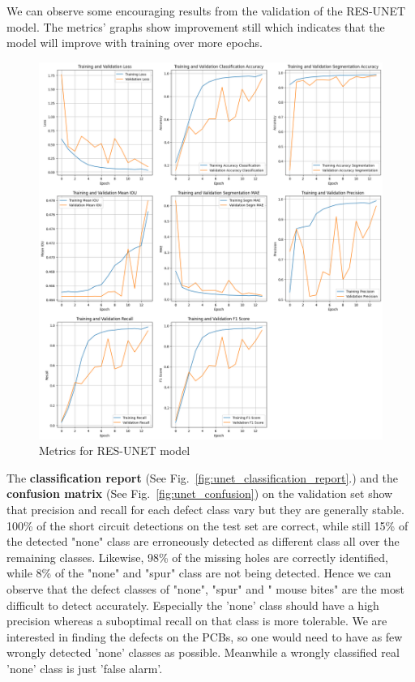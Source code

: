 \documentclass[12pt]{article}
\begin{document}
We can observe some encouraging results from the validation of the RES-UNET model. The metrics' graphs show improvement still which indicates that the model will improve with training over more epochs. 

\begin{figure}[H]
    \centering
    \includegraphics[width=\textwidth, keepaspectratio]{./graphics/RESUNET_training-history_v240618_1.png}
    \caption{Metrics for RES-UNET model}
    \label{fig:unet_training_history}
\end{figure}
\restoregeometry
\clearpage

The {\bf classification report} (See Fig.~\ref{fig:unet_classification_report}.) and the {\bf confusion matrix} (See Fig.~\ref{fig:unet_confusion}) on the validation set show that precision and recall for each defect class vary but they are generally stable. 100\% of the short circuit detections on the test set are correct, while still 15\% of the detected "none" class are erroneously detected as different class all over the remaining classes. Likewise, 98\% of the missing holes are correctly identified, while 8\% of the "none" and "spur" class are not being detected. Hence we can observe that the defect classes of "none", "spur" and " mouse bites" are the most difficult to detect accurately. Especially the 'none' class should have a high precision whereas a suboptimal recall on that class is more tolerable. We are interested in finding the defects on the PCBs, so one would need to have as few wrongly detected 'none' classes as possible. Meanwhile a wrongly classified real 'none' class is just 'false alarm'.
\end{document}
